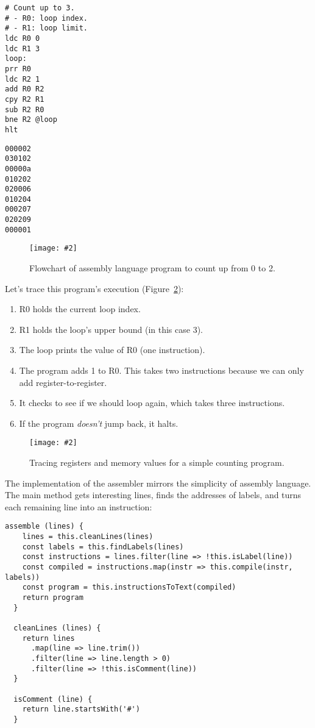 \documentclass[krantzl]{krantz}
\newcommand{\figpdf}[4]{\begin{figure}%
\centering%
\texttt{[image: \#2]}%
\caption{#3}%
\label{#1}%
\end{figure}}
\newcommand{\figref}[1]{Figure~\ref{#1}}
\begin{document}
\begin{lstlisting}[frame=single,frameround=tttt]
# Count up to 3.
# - R0: loop index.
# - R1: loop limit.
ldc R0 0
ldc R1 3
loop:
prr R0
ldc R2 1
add R0 R2
cpy R2 R1
sub R2 R0
bne R2 @loop
hlt
\end{lstlisting}



\begin{lstlisting}[frame=single,frameround=tttt]
000002
030102
00000a
010202
020006
010204
000207
020209
000001
\end{lstlisting}


\figpdf{virtual-machine-count-up}{./virtual-machine/count-up.pdf}{Flowchart of assembly language program to count up from 0 to 2.}{0.6}


Let's trace this program's execution
(\figref{virtual-machine-trace-counter}):

\begin{enumerate}

\item R0 holds the current loop index.

\item R1 holds the loop's upper bound (in this case 3).

\item The loop prints the value of R0 (one instruction).

\item The program adds 1 to R0.
    This takes two instructions because we can only add register-to-register.

\item It checks to see if we should loop again,
    which takes three instructions.

\item If the program \emph{doesn't} jump back, it halts.

\end{enumerate}

\figpdf{virtual-machine-trace-counter}{./virtual-machine/trace-counter.pdf}{Tracing registers and memory values for a simple counting program.}{0.6}


The implementation of the assembler mirrors the simplicity of assembly language.
The main method gets interesting lines,
finds the addresses of labels,
and turns each remaining line into an instruction:


\begin{lstlisting}[frame=single,frameround=tttt]
  assemble (lines) {
    lines = this.cleanLines(lines)
    const labels = this.findLabels(lines)
    const instructions = lines.filter(line => !this.isLabel(line))
    const compiled = instructions.map(instr => this.compile(instr, labels))
    const program = this.instructionsToText(compiled)
    return program
  }

  cleanLines (lines) {
    return lines
      .map(line => line.trim())
      .filter(line => line.length > 0)
      .filter(line => !this.isComment(line))
  }

  isComment (line) {
    return line.startsWith('#')
  }
\end{lstlisting}
\end{document}
